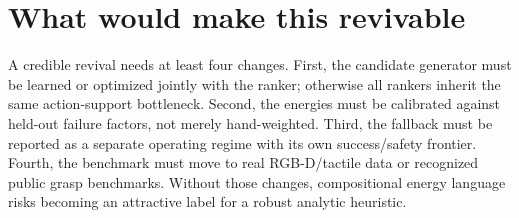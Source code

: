 \documentclass{article}
\begin{document}
\section{What would make this revivable}

A credible revival needs at least four changes.
First, the candidate generator must be learned or optimized jointly with the ranker; otherwise all rankers inherit the same action-support bottleneck.
Second, the energies must be calibrated against held-out failure factors, not merely hand-weighted.
Third, the fallback must be reported as a separate operating regime with its own success/safety frontier.
Fourth, the benchmark must move to real RGB-D/tactile data or recognized public grasp benchmarks.
Without those changes, compositional energy language risks becoming an attractive label for a robust analytic heuristic.



\end{document}
